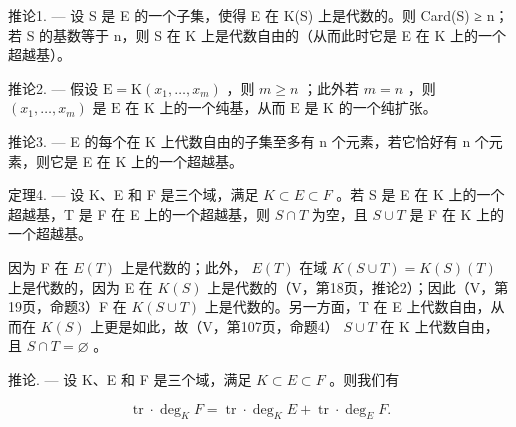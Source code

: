 推论1. --- 设 S 是 E 的一个子集，使得 E 在 K(S) 上是代数的。则 Card(S) ≥ n；若 S 的基数等于 n，则 S 在 K 上是代数自由的（从而此时它是 E 在 K 上的一个超越基）。

推论2. --- 假设 \(\mathrm{E} = \mathrm{K}(x_1, \ldots, x_m)\) ，则 \(m \geqslant n\) ；此外若 \(m = n\) ，则 \((x_1, \ldots, x_m)\) 是 \(\mathrm{E}\) 在 \(\mathrm{K}\) 上的一个纯基，从而 \(\mathrm{E}\) 是 \(\mathrm{K}\) 的一个纯扩张。

推论3. --- E 的每个在 K 上代数自由的子集至多有 n 个元素，若它恰好有 n 个元素，则它是 E 在 K 上的一个超越基。

定理4. --- 设 K、E 和 F 是三个域，满足 \(K \subset E \subset F\) 。若 S 是 E 在 K 上的一个超越基，T 是 F 在 E 上的一个超越基，则 \(S \cap T\) 为空，且 \(S \cup T\) 是 F 在 K 上的一个超越基。

因为 F 在 \(E(T)\) 上是代数的；此外， \(E(T)\) 在域 \(K(S \cup T) = K(S)(T)\) 上是代数的，因为 E 在 \(K(S)\) 上是代数的（V，第18页，推论2）；因此（V，第19页，命题3）F 在 \(K(S \cup T)\) 上是代数的。另一方面，T 在 E 上代数自由，从而在 \(K(S)\) 上更是如此，故（V，第107页，命题4） \(S \cup T\) 在 K 上代数自由，且 \(S \cap T = \varnothing\) 。

推论. --- 设 K、E 和 F 是三个域，满足 \(K \subset E \subset F\) 。则我们有

\[
\operatorname{tr} \cdot \deg_ {K} F = \operatorname{tr} \cdot \deg_ {K} E + \operatorname{tr} \cdot \deg_ {E} F.\tag{1}
\]

